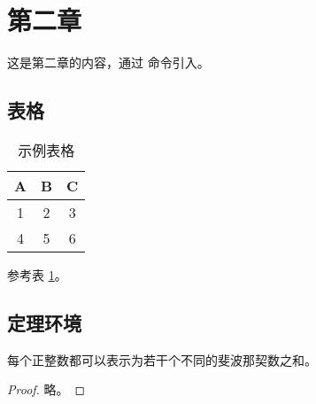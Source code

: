 \section{第二章}

这是第二章的内容，通过 \verb|| 命令引入。

\subsection{表格}

\begin{table}[htbp]
    \centering
    \begin{tabular}{|c|c|c|}
        \hline
        A & B & C \\
        \hline
        1 & 2 & 3 \\
        4 & 5 & 6 \\
        \hline
    \end{tabular}
    \caption{示例表格}
    \label{tab:example}
\end{table}

参考表 \ref{tab:example}。

\subsection{定理环境}

\begin{theorem}
    每个正整数都可以表示为若干个不同的斐波那契数之和。
\end{theorem}

\begin{proof}
    略。
\end{proof} 
